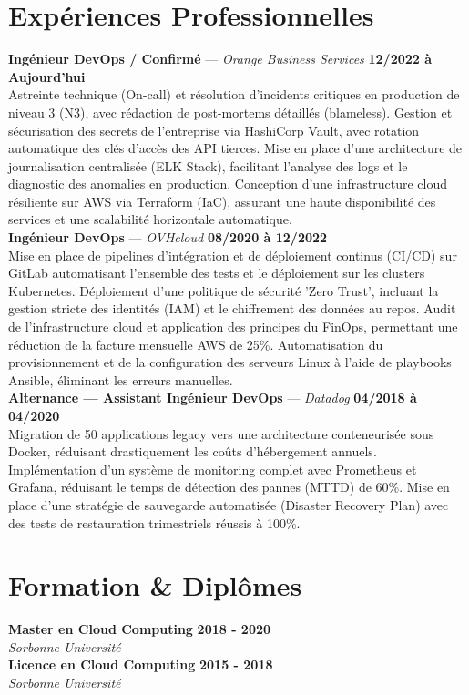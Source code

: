 \documentclass[11pt,a4paper]{article}
\begin{document}
\section*{Expériences Professionnelles}
\noindent \textbf{Ingénieur DevOps / Confirmé} --- \textit{Orange Business Services} \hfill \textbf{12/2022 à Aujourd'hui} \\
Astreinte technique (On-call) et résolution d'incidents critiques en production de niveau 3 (N3), avec rédaction de post-mortems détaillés (blameless). Gestion et sécurisation des secrets de l'entreprise via HashiCorp Vault, avec rotation automatique des clés d'accès des API tierces. Mise en place d'une architecture de journalisation centralisée (ELK Stack), facilitant l'analyse des logs et le diagnostic des anomalies en production. Conception d'une infrastructure cloud résiliente sur AWS via Terraform (IaC), assurant une haute disponibilité des services et une scalabilité horizontale automatique. \\[0.3cm]
\noindent \textbf{Ingénieur DevOps} --- \textit{OVHcloud} \hfill \textbf{08/2020 à 12/2022} \\
Mise en place de pipelines d'intégration et de déploiement continus (CI/CD) sur GitLab automatisant l'ensemble des tests et le déploiement sur les clusters Kubernetes. Déploiement d'une politique de sécurité 'Zero Trust', incluant la gestion stricte des identités (IAM) et le chiffrement des données au repos. Audit de l'infrastructure cloud et application des principes du FinOps, permettant une réduction de la facture mensuelle AWS de 25\%. Automatisation du provisionnement et de la configuration des serveurs Linux à l'aide de playbooks Ansible, éliminant les erreurs manuelles. \\[0.3cm]
\noindent \textbf{Alternance — Assistant Ingénieur DevOps} --- \textit{Datadog} \hfill \textbf{04/2018 à 04/2020} \\
Migration de 50 applications legacy vers une architecture conteneurisée sous Docker, réduisant drastiquement les coûts d'hébergement annuels. Implémentation d'un système de monitoring complet avec Prometheus et Grafana, réduisant le temps de détection des pannes (MTTD) de 60\%. Mise en place d'une stratégie de sauvegarde automatisée (Disaster Recovery Plan) avec des tests de restauration trimestriels réussis à 100\%. \\[0.3cm]


\vspace{0.3cm}

\section*{Formation \& Diplômes}
\noindent \textbf{Master en Cloud Computing} \hfill \textbf{2018 - 2020} \\
\textit{Sorbonne Université} \\[0.3cm]
\noindent \textbf{Licence en Cloud Computing} \hfill \textbf{2015 - 2018} \\
\textit{Sorbonne Université} \\[0.3cm]
\end{document}
